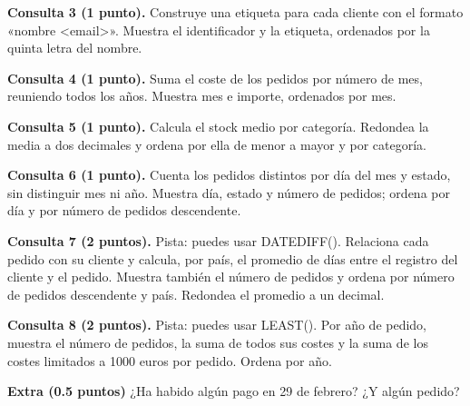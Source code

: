 \documentclass[11pt,a4paper]{article}
\begin{document}
\textbf{Consulta 3 (1 punto).} Construye una etiqueta para cada cliente con el formato «nombre \textless{}email\textgreater{}». Muestra el identificador y la etiqueta, ordenados por la quinta letra del nombre.\par\vspace{0.65em}
\textbf{Consulta 4 (1 punto).} Suma el coste de los pedidos por número de mes, reuniendo todos los años. Muestra mes e importe, ordenados por mes.\par\vspace{0.65em}
\textbf{Consulta 5 (1 punto).} Calcula el stock medio por categoría. Redondea la media a dos decimales y ordena por ella de menor a mayor y por categoría.\par\vspace{0.65em}
\textbf{Consulta 6 (1 punto).} Cuenta los pedidos distintos por día del mes y estado, sin distinguir mes ni año. Muestra día, estado y número de pedidos; ordena por día y por número de pedidos descendente.\par\vspace{0.65em}
\textbf{Consulta 7 (2 puntos).} Pista: puedes usar DATEDIFF(). Relaciona cada pedido con su cliente y calcula, por país, el promedio de días entre el registro del cliente y el pedido. Muestra también el número de pedidos y ordena por número de pedidos descendente y país. Redondea el promedio a un decimal.\par\vspace{0.65em}
\textbf{Consulta 8 (2 puntos).} Pista: puedes usar LEAST(). Por año de pedido, muestra el número de pedidos, la suma de todos sus costes y la suma de los costes limitados a 1000 euros por pedido. Ordena por año.\par\vspace{0.65em}
\textbf{Extra (0.5 puntos)} ¿Ha habido algún pago en 29 de febrero? ¿Y algún pedido?
\end{document}
